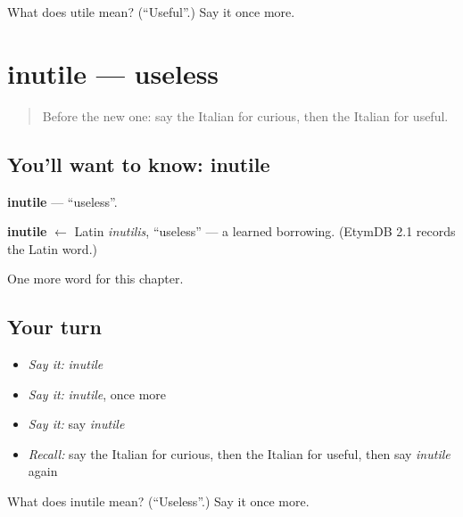 \begin{tcolorbox}[breakable,colback=teal!4,colframe=teal!35!black,title={Before you move on}]
What does utile mean? (\textquotedblleft{}Useful\textquotedblright{}.) Say it once more.
\end{tcolorbox}
\section[inutile]{inutile — useless}

\label{lesson:IT-C190-inutile}



\begin{quote}
Before the new one: say the Italian for curious, then the Italian for useful.
\end{quote}

\subsection*{You'll want to know: inutile}
\textbf{inutile} — \textquotedblleft{}useless\textquotedblright{}.

\begin{cousinweb}
\textbf{inutile} $\leftarrow$ Latin \emph{inutilis}, \textquotedblleft{}useless\textquotedblright{} — a learned borrowing. (EtymDB 2.1 records the Latin word.)
\end{cousinweb}

\begin{grammarlens}[title={What you've built}]
One more word for this chapter.
\end{grammarlens}

\subsection*{Your turn}
\begin{itemize}
\raggedright
  \item \emph{Say it:} \emph{inutile}
  \item \emph{Say it:} \emph{inutile}, once more
  \item \emph{Say it:} say \emph{inutile}
  \item \emph{Recall:} say the Italian for curious, then the Italian for useful, then say \emph{inutile} again
\end{itemize}

\begin{tcolorbox}[breakable,colback=teal!4,colframe=teal!35!black,title={Before you move on}]
What does inutile mean? (\textquotedblleft{}Useless\textquotedblright{}.) Say it once more.
\end{tcolorbox}
